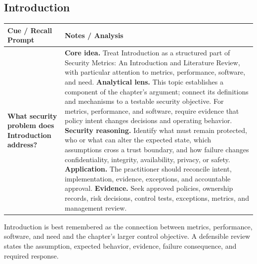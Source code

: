 \documentclass[11pt]{article}
\newcommand{\CornellHeader}{%
\rowcolor{Navy}\color{white}\bfseries Cue / Recall Prompt & \color{white}\bfseries Notes / Analysis\\\hline}
\newcommand{\CornellRow}[2]{%
\cellcolor{CueGray}\RaggedRight\textbf{#1} & \RaggedRight #2\\\hline}
\begin{document}
\subsection*{Introduction}
\begin{longtable}{>{\RaggedRight\arraybackslash}p{}|>{\RaggedRight\arraybackslash}p{}}
\CornellHeader
\CornellRow{What security problem does Introduction address?}{\textbf{Core idea.} Treat Introduction as a structured part of Security Metrics: An Introduction and Literature Review, with particular attention to metrics, performance, software, and need. \textbf{Analytical lens.} This topic establishes a component of the chapter's argument; connect its definitions and mechanisms to a testable security objective. For metrics, performance, and software, require evidence that policy intent changes decisions and operating behavior. \textbf{Security reasoning.} Identify what must remain protected, who or what can alter the expected state, which assumptions cross a trust boundary, and how failure changes confidentiality, integrity, availability, privacy, or safety. \textbf{Application.} The practitioner should reconcile intent, implementation, evidence, exceptions, and accountable approval. \textbf{Evidence.} Seek approved policies, ownership records, risk decisions, control tests, exceptions, metrics, and management review.}
\end{longtable}
\begin{topicsummary}
Introduction is best remembered as the connection between metrics, performance, software, and need and the chapter's larger control objective. A defensible review states the assumption, expected behavior, evidence, failure consequence, and required response.
\end{topicsummary}
\end{document}
